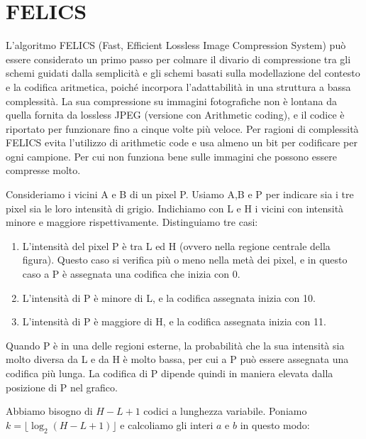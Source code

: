 \section{FELICS}
L'algoritmo FELICS (Fast, Efficient Lossless Image Compression System) può essere considerato un primo passo per colmare il divario di compressione tra gli schemi guidati dalla semplicità e gli schemi basati sulla modellazione del contesto e la codifica aritmetica, poiché incorpora l'adattabilità in una struttura a bassa complessità.
La sua compressione su immagini fotografiche non è lontana da quella fornita da lossless JPEG (versione con Arithmetic coding), e il codice è riportato per funzionare fino a cinque volte più veloce. Per ragioni di complessità FELICS evita l'utilizzo di arithmetic code e usa almeno un bit per codificare per ogni campione. Per cui non funziona bene sulle immagini che possono essere compresse molto.  

\begin{figure}[htbp!]
  \centering
  
\end{figure}
\FloatBarrier

Consideriamo i vicini A e B di un pixel P. Usiamo A,B e P per indicare sia i tre pixel sia le loro intensità di grigio. Indichiamo con L e H i vicini con intensità minore e maggiore rispettivamente. Distinguiamo tre casi:

\begin{enumerate}
    \item L'intensità del pixel P è tra L ed H (ovvero nella regione centrale della figura). Questo caso si verifica più o meno nella metà dei pixel, e in questo caso a P è assegnata una codifica che inizia con 0.
    \item L'intensità di P è minore di L, e la codifica assegnata inizia con 10.
    \item L'intensità di P è maggiore di H, e la codifica assegnata inizia con 11.
\end{enumerate}

Quando P è in una delle regioni esterne, la probabilità che la sua intensità sia molto diversa da L e da H è molto bassa, per cui a P può essere assegnata una codifica più lunga. La codifica di P dipende quindi in maniera elevata dalla posizione di P nel grafico. 

Abbiamo bisogno di \(H - L + 1\) codici a lunghezza variabile. Poniamo \(k = \lfloor \log_2 (H - L + 1) \rfloor\) e calcoliamo gli interi \(a\) e \(b\) in questo modo:

